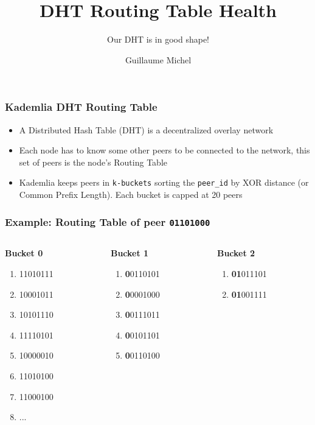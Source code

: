 \documentclass{pl-slide}
\title{DHT Routing Table Health}
\subtitle{Our DHT is in good shape!}
\author{Guillaume Michel}
\institute{Protocol Labs}
\date{\DTMdate{2022-07-07}}
\begin{document}
\frame{\titlepage}

\begin{frame}
\frametitle{Kademlia DHT Routing Table}
\begin{itemize}
	\item A Distributed Hash Table (DHT) is a decentralized overlay network
	\item Each node has to know some other peers to be connected to the network, this set of peers is the node's Routing Table
	\item Kademlia keeps peers in \texttt{k-buckets} sorting the \texttt{peer\_id} by XOR distance (or Common Prefix Length). Each bucket is capped at 20 peers
\end{itemize}
\end{frame}

\begin{frame}
\frametitle{Example: Routing Table of peer \texttt{01101000}}
\begin{columns}[onlytextwidth,t]
\begin{column}{0.19\textwidth}
	\textbf{Bucket 0}
   	\begin{enumerate}
   		\item 11010111
   		\item 10001011
   		\item 10101110
   		\item 11110101
   		\item 10000010
   		\item 11010100
   		\item 11000100
   		\item ...
   	\end{enumerate}
\end{column}
\begin{column}{0.19\textwidth}
	\textbf{Bucket 1}
   \begin{enumerate}
   		\item \textbf{0}0110101
   		\item \textbf{0}0001000
   		\item \textbf{0}0111011
   		\item \textbf{0}0101101
   		\item \textbf{0}0110100
   \end{enumerate}
\end{column}
\begin{column}{0.19\textwidth}
	\textbf{Bucket 2}
   \begin{enumerate}
   		\item \textbf{01}011101
   		\item \textbf{01}001111

\end{enumerate}
\end{column}
\end{columns}
\end{frame}
\end{document}
